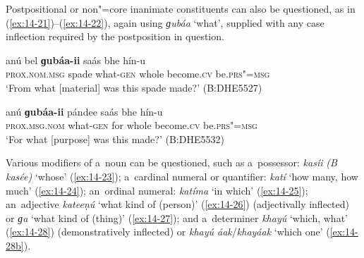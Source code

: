 Postpositional or non"=core inanimate constituents can also be questioned, as in (\ref{ex:14-21})--(\ref{ex:14-22}), again using \textit{ɡubáa} `what', supplied with any case inflection required by the postposition in question.

\begin{exe}
\ex
\label{ex:14-21}
\gll anú bel \textbf{ɡubáa-ii} saás bhe hín-u  \\
\textsc{prox.nom.msg} spade what-\textsc{gen} whole become.\textsc{cv}  be.\textsc{prs"=msg} \\
\glt `From what [material] was this spade made?' (B:DHE5527)

\ex
\label{ex:14-22}
\gll anú \textbf{ɡubáa-ii} pándee saás bhe  hín-u \\
\textsc{prox.msg.nom} what-\textsc{gen} for whole become.\textsc{cv}  be.\textsc{prs"=msg} \\
\glt `For what [purpose] was this made?' (B:DHE5532)
\end{exe}

 Various modifiers of a~noun can be questioned,
such as a~possessor: \textit{kasíi} \textit{(B kasée)} `whose' (\ref{ex:14-23});
a~cardinal numeral or quantifier: \textit{katí} `how many, how much' (\ref{ex:14-24});
an~ordinal numeral: \textit{katíma} `in which' (\ref{ex:14-25}); an~adjective
\textit{kateeṇú} `what kind of (person)' (\ref{ex:14-26}) (adjectivally inflected) or
\textit{ɡa} `what kind of (thing)' (\ref{ex:14-27}); and a~determiner \textit{khayú} `which,
what' (\ref{ex:14-28}) (demonstratively inflected) or \textit{khayú áak}/\textit{khayáak} `which one' (\ref{ex:14-28b}).

